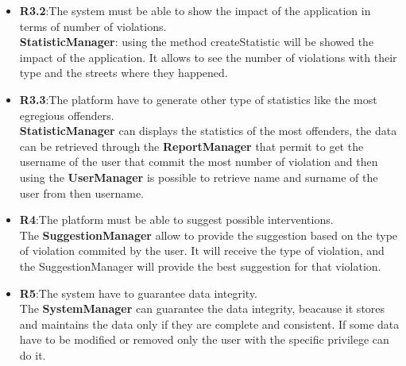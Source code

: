 \begin{itemize}
	\item 
	\textbf{R3.2}:The system must be able to show the impact of the application in terms of number of violations. \\
	\textbf{StatisticManager}: using the method createStatistic will be showed the impact of the application. It allows to see the number of violations with their type and the streets where they happened.
	
	\item 
	\textbf{R3.3}:The platform have to generate other type of statistics like the most egregious offenders. \\
	\textbf{StatisticManager} can displays the statistics of the most offenders, the data can be retrieved through the \textbf{ReportManager} that permit to get the username of the user that commit the most number of violation and then using the \textbf{UserManager} is possible to retrieve name and surname of the user from then username.
	
	
	\item 
	\textbf{R4}:The platform must be able to suggest possible interventions. \\
	The \textbf{SuggestionManager} allow to provide the suggestion based on the type of violation commited by the user. It will receive the type of violation, and the SuggestionManager will provide the best suggestion for that violation.
	
	\item 
	\textbf{R5}:The system have to guarantee data integrity. \\ 
	The \textbf{SystemManager} can guarantee the data integrity, beacause it stores and maintains the data only if they are complete and consistent. If some data have to be modified or removed only the user with the specific privilege can do it.
	
	
	
	
	
\end{itemize}